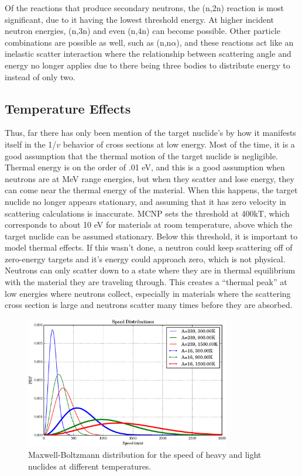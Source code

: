 Of the reactions that produce secondary neutrons, the (n,2n) reaction is most significant, due to it having the lowest threshold energy.  At higher incident neutron energies, (n,3n) and even (n,4n) can become possible.  Other particle combinations are possible as well, such as (n,n$\alpha$), and these reactions act like an inelastic scatter interaction where the relationship between scattering angle and energy no longer applies due to there being three bodies to distribute energy to instead of only two.

\subsection{Temperature Effects}

Thus, far there has only been mention of the target nuclide's by how it manifests itself in the 1/$v$ behavior of cross sections at low energy.  Most of the time, it is a good assumption that the thermal motion of the target nuclide is negligible.  Thermal energy is on the order of .01 eV, and this is a good assumption when neutrons are at MeV range energies, but when they scatter and lose energy, they can come near the thermal energy of the material.  When this happens, the target nuclide no longer appears stationary, and assuming that it has zero velocity in scattering calculations is inaccurate.  MCNP sets the threshold at 400kT, which corresponds to about 10 eV for materials at room temperature, above which the target nuclide can be assumed stationary.  Below this threshold, it is important to model thermal effects.  If this wasn't done, a neutron could keep scattering off of zero-energy targets and it's energy could approach zero, which is not physical.  Neutrons can only scatter down to a state where they are in thermal equilibrium with the material they are traveling through.  This creates a ``thermal peak'' at low energies where neutrons collect, especially in materials where the scattering cross section is large and neutrons scatter many times before they are absorbed.

\begin{figure}[h!]
  \label{MB_dist}
  \centering
    \includegraphics[width=0.8\textwidth]{graphics/MB_dist.eps}
     \caption{Maxwell-Boltzmann distribution for the speed of heavy and light nuclides at different temperatures.}
\end{figure}


